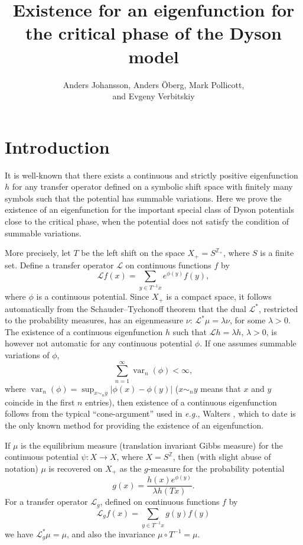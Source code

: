 \documentclass[11pt, a4paper, oneside]{article}
\title{Existence for an eigenfunction for the critical phase of the Dyson model}
\author{Anders Johansson, Anders \"Oberg, Mark Pollicott, \\ and Evgeny Verbitskiy}
\date{}
\theoremstyle{definition}
\theoremstyle{remark}
\providecommand{\opn}{\operatorname}
\providecommand{\var}{\opn{var}}
\begin{document}
\maketitle


\section{Introduction}\noindent
It is well-known that there exists a continuous and strictly positive
eigenfunction $h$ for any transfer operator defined on a symbolic shift space
with finitely many symbols such that the potential has summable variations. Here
we prove the existence of an eigenfunction for the important special class of
Dyson potentials close to the critical phase, when the potential does not
satisfy the condition of summable variations.

\def\h{h}
More precisely, let $T$ be the left shift on the space $X_+=S^{{\mathbb Z}_+}$,
where $S$ is a finite set. Define a transfer operator ${\mathcal L}$ on
continuous functions $f$ by
\begin{equation}\label{trans} {\mathcal L} f(x)= \sum_{y\in T^{-1}x}
  e^{\phi(y)}f(y),
\end{equation}
where $\phi$ is a continuous potential. Since $X_+$ is a compact space, it
follows automatically from the Schauder--Tychonoff theorem that the dual
${\mathcal L}^*$, restricted to the probability measures, has an eigenmeasure
$\nu$: ${\mathcal L}^* \mu=\lambda \nu$, for some $\lambda>0$. The existence of
a continuous eigenfunction $h$ such that ${\mathcal L}h=\lambda h$, $\lambda>0$,
is however not automatic for any continuous potential $\phi$. If one assumes
summable variations of $\phi$,
\begin{equation}\label{sum}
  \sum_{n=1}^\infty \var_n (\phi)<\infty,
\end{equation}
where $\var_n(\phi)=\sup_{x\sim_n y}|\phi(x)-\phi(y)|$ ($x\sim_n y$ means that
$x$ and $y$ coincide in the first $n$ entries), then existence of a continuous
eigenfunction follows from the typical ``cone-argument'' used in {\em e.g.},
Walters \cite{walters1}, which to date is the only known method for providing the
existence of an eigenfunction.

If $\mu$ is the equilibrium measure (translation invariant Gibbs measure) for
the continuous potential $\psi:X\to X$, where $X=S^{\mathbb Z}$, then (with
slight abuse of notation) $\mu$ is recovered on $X_+$ as the $g$-measure for the
probability potential
\begin{equation}\label{g}
  g(x)= \frac{h(x) e^{\phi(y)}}{\lambda h(Tx)}.
\end{equation} 
For a transfer operator ${\mathcal L}_g$, defined on continuous functions $f$ by
\begin{equation} {\mathcal L}_g f(x)=\sum_{y\in T^{-1}x} g(y) f(y)
\end{equation}
we have ${\mathcal L}_g^*\mu=\mu$, and also the invariance $\mu\circ
T^{-1}=\mu$.
\end{document}
